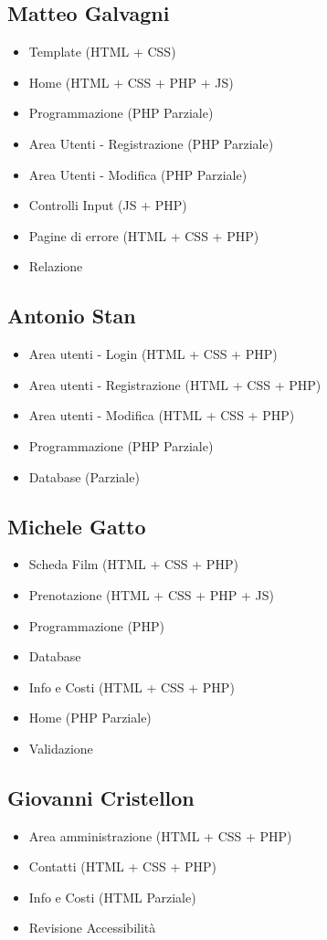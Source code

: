 \documentclass[a4paper, 12pt]{article}
\begin{document}
\subsection{Matteo Galvagni}
\begin{itemize}
    \item Template (HTML + CSS)
    \item Home (HTML + CSS + PHP + JS)
    \item Programmazione (PHP Parziale)
    \item Area Utenti - Registrazione (PHP Parziale)
    \item Area Utenti - Modifica (PHP Parziale)
    \item Controlli Input (JS + PHP)
    \item Pagine di errore (HTML + CSS + PHP)
    \item Relazione
\end{itemize}
\subsection{Antonio Stan}
\begin{itemize}
    \item Area utenti - Login (HTML + CSS + PHP)
    \item Area utenti - Registrazione (HTML + CSS + PHP)
    \item Area utenti - Modifica (HTML + CSS + PHP)
    \item Programmazione (PHP Parziale)
    \item Database (Parziale)
\end{itemize}
\subsection{Michele Gatto}
\begin{itemize}
    \item Scheda Film (HTML + CSS + PHP)
    \item Prenotazione (HTML + CSS + PHP + JS)
    \item Programmazione (PHP)
    \item Database
    \item Info e Costi (HTML + CSS + PHP)
    \item Home (PHP Parziale)
    \item Validazione
\end{itemize}
\subsection{Giovanni Cristellon}
\begin{itemize}
    \item Area amministrazione (HTML + CSS + PHP)
    \item Contatti (HTML + CSS + PHP)
    \item Info e Costi (HTML Parziale)
    \item Revisione Accessibilità
\end{itemize}
\end{document}
